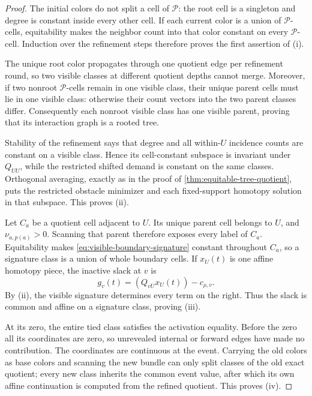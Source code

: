 \begin{proof}
The initial colors do not split a cell of $\mathcal P$: the root cell is a
singleton and degree is constant inside every other cell.  If each current
color is a union of $\mathcal P$-cells, equitability makes the neighbor count
into that color constant on every $\mathcal P$-cell.  Induction over the
refinement steps therefore proves the first assertion of (i).

The unique root color propagates through one quotient edge per refinement
round, so two visible classes at different quotient depths cannot merge.
Moreover, if two nonroot $\mathcal P$-cells remain in one visible class, their
unique parent cells must lie in one visible class: otherwise their count
vectors into the two parent classes differ.  Consequently each nonroot
visible class has one visible parent, proving that its interaction graph is a
rooted tree.

Stability of the refinement says that degree and all within-$U$ incidence
counts are constant on a visible class.  Hence its cell-constant subspace is
invariant under $Q_{UU}$, while the restricted shifted demand is constant on
the same classes.  Orthogonal averaging, exactly as in the proof of
\cref{thm:equitable-tree-quotient}, puts the restricted obstacle minimizer and
each fixed-support homotopy solution in that subspace.  This proves (ii).

Let $C_a$ be a quotient cell adjacent to $U$.  Its unique parent cell belongs
to $U$, and $\nu_{a,p(a)}>0$.  Scanning that parent therefore exposes every
label of $C_a$.  Equitability makes
\cref{eq:visible-boundary-signature} constant throughout $C_a$, so a
signature class is a union of whole boundary cells.  If $x_U(t)$ is one
affine homotopy piece, the inactive slack at $v$ is
\begin{equation*}
 g_v(t)=(Q_{vU}x_U(t))-c_{\rho,v}.
\end{equation*}
By (ii), the visible signature determines every term on the right.  Thus the
slack is common and affine on a signature class, proving (iii).

At its zero, the entire tied class satisfies the activation equality.  Before
the zero all its coordinates are zero, so unrevealed internal or forward
edges have made no contribution.  The coordinates are continuous at the
event.  Carrying the old colors as base colors and scanning the new bundle
can only split classes of the old exact quotient; every new class inherits
the common event value, after which its own affine continuation is computed
from the refined quotient.  This proves (iv).
\end{proof}

